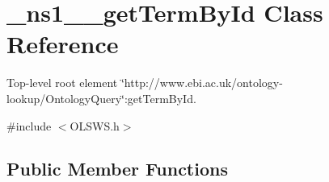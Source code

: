 \hypertarget{class__ns1____getTermById}{
\section{\_\-ns1\_\-\_\-getTermById Class Reference}
\label{class__ns1____getTermById}
}


Top-\/level root element \char`\"{}http://www.ebi.ac.uk/ontology-\/lookup/OntologyQuery\char`\"{}:getTermById.  




{\ttfamily \#include $<$OLSWS.h$>$}

\subsection*{Public Member Functions}
